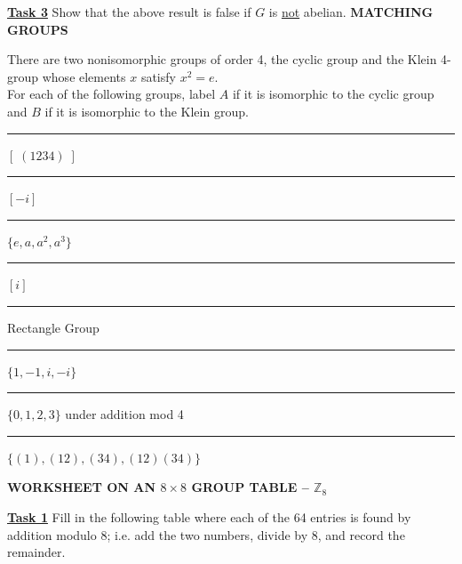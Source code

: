 \documentclass[12pt, fleqn, twoside]{book}
\makeatletter
\def\cleardoublepage{\clearpage\if@twoside \ifodd\c@page\else
   \hbox{}\thispagestyle{empty}\newpage\if@twocolumn\hbox{}\newpage\fi\fi\fi}
\makeatother
\begin{document}
\underline{\bf{Task 3}} Show that the above result is false if $G$ is \underline{not} abelian.
%
%
%
\cleardoublepage
%
%
%
{\large \bf 	MATCHING GROUPS}\\[.25in]
There are two nonisomorphic groups of order 4, the cyclic group and the Klein 4-group whose elements $x$ satisfy $x^2=e$.\\[.25in]
For each of the following groups, label $A$ if it is isomorphic to the cyclic group and $B$ if it is isomorphic to the Klein group.\\[.25in]
\parbox{4in}{\rule{1in}{.01in} $[\;(1234)\;]$\\[.5in]
\rule{1in}{.01in} $[ -i]$\\[.5in]
\rule{1in}{.01in} $\{ e,a,a^2,a^3\}$\\[.5in]
\rule{1in}{.01in} $[i]$\\[.5in]
\rule{1in}{.01in} Rectangle Group\\[.5in]
\rule{1in}{.01in} $\{1,-1, i,-i\}$\\[.5in]
\rule{1in}{.01in} $\{0,1,2,3\}$ under addition mod 4\\[.5in]
\rule{1in}{.01in} $\{(1), (12), (34), (12)(34)\}$
}
%
%
%
\cleardoublepage
%
%
%
{\large\bf WORKSHEET ON AN $8\times 8$ GROUP TABLE --  $\mathbb{Z}_8$}\\[.25in]
%
\textbf{\underline{Task 1}} Fill in the following table where each of the 64 entries is found by addition modulo 8; i.e. add the two numbers, divide by 8, and record the remainder.\\[.5in]
\rule{0 in}{.5in}
\end{document}
